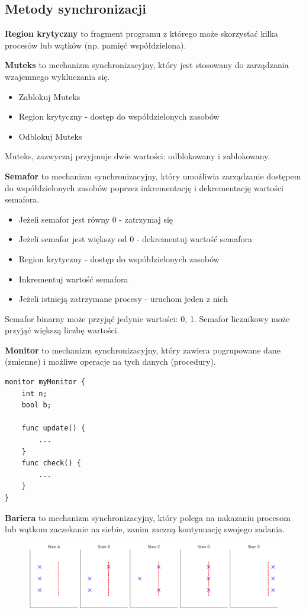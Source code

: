 \documentclass{article}
\begin{document}
\subsection{Metody synchronizacji}
\textbf{Region krytyczny} to fragment programu z którego może skorzystać kilka procesów lub wątków (np. pamięć współdzielona).

\textbf{Muteks} to mechanizm synchronizacyjny, który jest stosowany do zarządzania wzajemnego wykluczania się.
\begin{itemize}
    \item Zablokuj Muteks
    \item Region krytyczny - dostęp do współdzielonych zasobów
    \item Odblokuj Muteks
\end{itemize}
Muteks, zazwyczaj przyjmuje dwie wartości: odblokowany i zablokowany.

\textbf{Semafor} to mechanizm synchronizacyjny, który umożliwia zarządzanie dostępem do współdzielonych zasobów poprzez inkrementację i dekrementację wartości semafora.
\begin{itemize}
    \item Jeżeli semafor jest równy 0 - zatrzymaj się
    \item Jeżeli semafor jest większy od 0 - dekrementuj wartość semafora
    \item Region krytyczny - dostęp do współdzielonych zasobów
    \item Inkrementuj wartość semafora
    \item Jeżeli istnieją zatrzymane procesy - uruchom jeden z nich
\end{itemize}
Semafor binarny może przyjąć jedynie wartości: 0, 1. Semafor licznikowy może przyjąć większą liczbę wartości.

\textbf{Monitor} to mechanizm synchronizacyjny, który zawiera pogrupowane dane (zmienne) i możliwe operacje na tych danych (procedury).
\begin{verbatim}
monitor myMonitor {
    int n;
    bool b;

    func update() {
        ...
    }
    func check() {
        ...
    }
}
\end{verbatim}

\newpage\textbf{Bariera} to mechanizm synchronizacyjny, który polega na nakazaniu procesom lub wątkom zaczekanie na siebie, zanim zaczną kontynuację swojego zadania.
\begin{figure}[ht]
    \centering
    \includegraphics[width=\textwidth]{img/bariera.png}
\end{figure}
\end{document}
